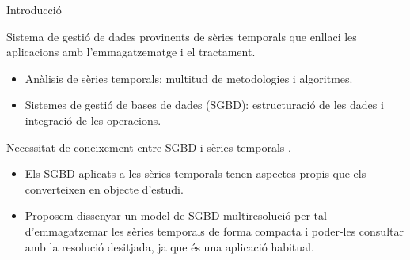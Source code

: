 \begin{frame}{Introducció}


  Sistema de gestió de dades provinents de sèries temporals que
  enllaci les aplicacions amb l'emmagatzematge i el tractament.

  \begin{itemize}

  \item Anàlisis de sèries temporals: multitud de metodologies i algoritmes.

  \item Sistemes de gestió de bases de dades (SGBD): estructuració de
    les dades i integració de les operacions.

  \end{itemize}
  
  Necessitat de coneixement entre SGBD i sèries
  temporals \parencite{stonebraker09:scidb,zhang11}.

  \begin{itemize}

  \item Els SGBD aplicats a les sèries temporals tenen aspectes propis
    que els converteixen en objecte d’estudi.

  \item Proposem dissenyar un model de SGBD multiresolució per tal
    d'emmagatzemar les sèries temporals de forma compacta i poder-les
    consultar amb la resolució desitjada, ja que és una aplicació
    habitual.

  \end{itemize}






\end{frame}






